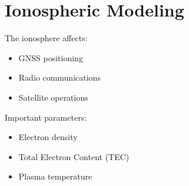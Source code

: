 \section{Ionospheric Modeling}


The ionosphere affects:


\begin{itemize}

\item GNSS positioning

\item Radio communications

\item Satellite operations

\end{itemize}



Important parameters:


\begin{itemize}

\item Electron density

\item Total Electron Content (TEC)

\item Plasma temperature

\end{itemize}
